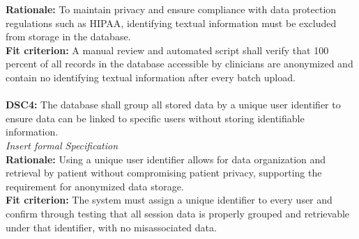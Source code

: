 \documentclass[12pt]{article}
\begin{document}
\textbf{Rationale: } To maintain privacy and ensure compliance with data protection regulations such as HIPAA, 
identifying textual information must be excluded from storage in the database.\\
\textbf{Fit criterion: } A manual review and automated script shall verify that 100 percent of all records in 
the database accessible by clinicians are anonymized and contain no identifying textual information after every 
batch upload.\\\\
\textbf{DSC4: }The database shall group all stored data by a unique user identifier to ensure data can be linked 
to specific users without storing identifiable information.\\
\textit{Insert formal Specification}\\
\textbf{Rationale: } Using a unique user identifier allows for data organization and retrieval by patient without 
compromising patient privacy, supporting the requirement for anonymized data storage.\\
\textbf{Fit criterion: } The system must assign a unique identifier to every user and confirm through testing 
that all session data is properly grouped and retrievable under that identifier, with no misassociated data.\\\\
\end{document}
